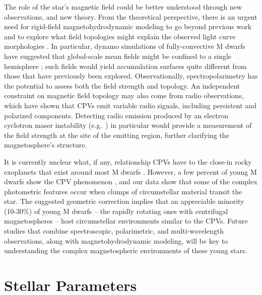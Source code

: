 \documentclass[11pt,twocolumn,tighten,linenumbers]{aastex7}
\begin{document}
The role of the star's magnetic field could be better understood
through new observations, and new theory.  From the theoretical
perspective, there is an urgent need for rigid-field
magnetohydrodynamic modeling to go beyond previous work
\citep{Townsend2005,Townsend2008,Krticka2022} and to explore what field
topologies might explain the observed light curve morphologies
\citep{Bouma2024}.  In particular, dynamo simulations of
fully-convective M dwarfs have suggested that global-scale mean fields
might be confined to a single hemisphere \citep{Brown2020}; such fields
would yield accumulation surfaces quite different from those that have
previously been explored.  Observationally, spectropolarimetry has the
potential to assess both the field strength and topology.  An
independent constraint on magnetic field topology may also come from
radio observations, which have shown \citep{Kaur2024} that CPVs emit
variable radio signals, including persistent and polarized components.
Detecting radio emission produced by an electron cyclotron maser
instability (e.g.~\citealt{Callingham2021}) in particular would provide a
measurement of the field strength at the site of the emitting region,
further clarifying the magnetosphere's structure.

It is currently unclear what, if any, relationship CPVs have to the
close-in rocky exoplanets that exist around most M dwarfs
\citep{Dressing2015}.  However, a few percent of young M dwarfs show
the CPV phenomenon \citep{Rebull2020}, and our data show that some of
the complex photometric features occur when clumps of circumstellar
material transit the star.  The suggested geometric correction implies
that an appreciable minority (10-30\%) of young M dwarfs -- the
rapidly rotating ones with centrifugal magnetospheres -- host
circumstellar environments similar to the CPVs.  Future studies that
combine spectroscopic, polarimetric, and multi-wavelength
observations, along with magnetohydrodynamic modeling, will be key to
understanding the complex magnetospheric environments of these young
stars.




\appendix

\section{Stellar Parameters}
\label{sec:stparams}
\end{document}
